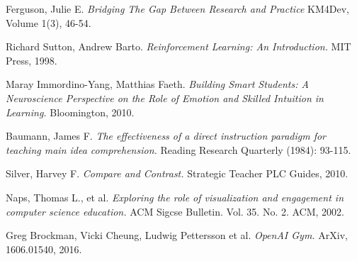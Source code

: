 \documentclass[11pt]{article} %
\begin{document}
\begin{thebibliography}{9}

  Ferguson, Julie E.
  \textit{Bridging The Gap Between Research and Practice}
  KM4Dev, Volume 1(3), 46-54.
 
  Richard Sutton, Andrew Barto.
  \textit{Reinforcement Learning: An Introduction.}
  MIT Press, 1998.
 
  Maray Immordino-Yang, Matthias Faeth.
  \textit{Building Smart Students: A Neuroscience Perspective on the Role
    of Emotion and Skilled Intuition in Learning.}
  Bloomington, 2010.
 
  Baumann, James F.
  \textit{The effectiveness of a direct instruction paradigm for teaching main idea comprehension.}
  Reading Research Quarterly (1984): 93-115.
 
  Silver, Harvey F.
  \textit{Compare and Contrast.}
  Strategic Teacher PLC Guides, 2010.
 
  Naps, Thomas L., et al.
  \textit{Exploring the role of visualization and engagement in computer science education.}
  ACM Sigcse Bulletin. Vol. 35. No. 2. ACM, 2002.
 
  Greg Brockman, Vicki Cheung, Ludwig Pettersson et al.
  \textit{OpenAI Gym.}
  ArXiv, 1606.01540, 2016.
 
\end{thebibliography}
\end{document}
